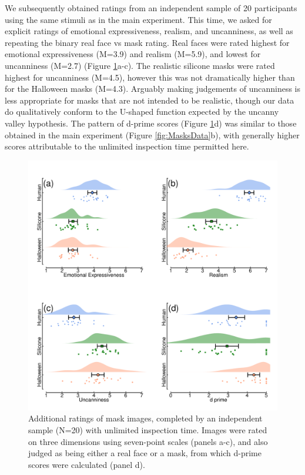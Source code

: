 \documentclass[
]{article}
\begin{document}
We subsequently obtained ratings from an independent sample of 20 participants using the same stimuli as in the main experiment. This time, we asked for explicit ratings of emotional expressiveness, realism, and uncanniness, as well as repeating the binary real face vs mask rating. Real faces were rated highest for emotional expressiveness (M=3.9) and realism (M=5.9), and lowest for uncanniness (M=2.7) (Figure \ref{fig:maskratings}a-c). The realistic silicone masks were rated highest for uncanniness (M=4.5), however this was not dramatically higher than for the Halloween masks (M=4.3). Arguably making judgements of uncanniness is less appropriate for masks that are not intended to be realistic, though our data do qualitatively conform to the U-shaped function expected by the uncanny valley hypothesis. The pattern of d-prime scores (Figure \ref{fig:maskratings}d) was similar to those obtained in the main experiment (Figure \ref{fig:MasksData}b), with generally higher scores attributable to the unlimited inspection time permitted here.

\begin{figure}

{\centering \includegraphics[width=0.7\linewidth]{Figures/MaskRatings} 

}

\caption{Additional ratings of mask images, completed by an independent sample (N=20) with unlimited inspection time. Images were rated on three dimensions using seven-point scales (panels a-c), and also judged as being either a real face or a mask, from which d-prime scores were calculated (panel d).}\label{fig:maskratings}
\end{figure}
\end{document}
